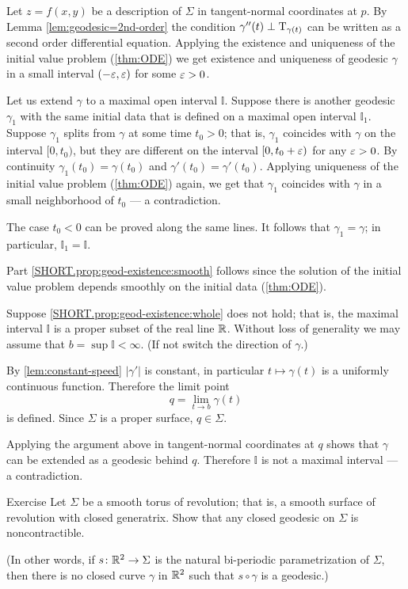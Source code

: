 Let $z=f(x,y)$ be a description of $\Sigma$ in tangent-normal coordinates at $p$.
By Lemma \ref{lem:geodesic=2nd-order} the condition $\gamma''(t)\perp\mathrm{T}_{\gamma(t)}$ can be written as a second order differential equation.
Applying the existence and uniqueness of the initial value problem (\ref{thm:ODE}) we get existence and uniqueness of geodesic $\gamma$  in a small interval $(-\varepsilon,\varepsilon)$ for some $\varepsilon>0$.

Let us extend $\gamma$ to a maximal open interval $\mathbb{I}$.
Suppose there is another geodesic $\gamma_1$ with the same initial data that is defined on a maximal open interval $\mathbb{I}_1$.
Suppose $\gamma_1$ splits from $\gamma$ at some time $t_0>0$;
that is, $\gamma_1$ coincides with $\gamma$ on the interval $[0,t_0)$, but they are different on the interval $[0,t_0+\varepsilon)$ for any $\varepsilon>0$.
By continuity $\gamma_1(t_0)=\gamma(t_0)$ and $\gamma'(t_0)=\gamma'(t_0)$.
Applying uniqueness of the initial value problem (\ref{thm:ODE}) again, we get that $\gamma_1$ coincides with $\gamma$ in a small neighborhood of $t_0$ --- a contradiction.

The case $t_0<0$ can be proved along the same lines.
It follows that $\gamma_1=\gamma$;
in particular, $\mathbb{I}_1=\mathbb{I}$.

Part \ref{SHORT.prop:geod-existence:smooth} follows since the solution of the initial value problem depends smoothly on the initial data (\ref{thm:ODE}).

Suppose \ref{SHORT.prop:geod-existence:whole} does not hold;
that is, the maximal interval $\mathbb{I}$ is a proper subset of the real line $\mathbb{R}$.
Without loss of generality we may assume that $b=\sup\mathbb{I}<\infty$.
(If not switch the direction of $\gamma$.)

By \ref{lem:constant-speed} $|\gamma'|$ is constant, in particular $t\mapsto \gamma(t)$ is a uniformly continuous function.
Therefore  the limit point
\[q=\lim_{t\to b}\gamma(t)\] 
is defined.
Since $\Sigma$ is a proper surface, $q\in \Sigma$. 

Applying the argument above in tangent-normal coordinates at $q$ shows that $\gamma$ can be extended as a geodesic behind $q$.
Therefore $\mathbb{I}$ is not a maximal interval --- a contradiction.
\qeds

\begin{thm}{Exercise}\label{ex:round-torus}
Let $\Sigma$ be a smooth torus of revolution; that is,
a smooth surface of revolution with closed generatrix.
Show that any closed geodesic on $\Sigma$ is noncontractible.

(In other words, if $s\colon\mathbb{R}^2\to \Sigma$ is the natural bi-periodic parametrization of $\Sigma$, then
there is no closed curve $\gamma$ in $\mathbb{R}^2$ such that $s\circ\gamma$ is a geodesic.)
\end{thm}


